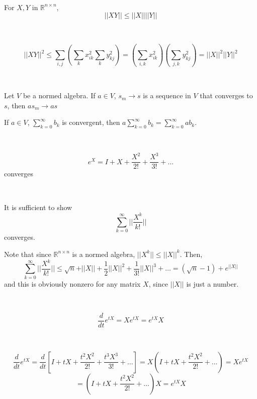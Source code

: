 \documentclass{article}
\begin{document}
\begin{proposition}
  \

  For $X,Y$ in $\mathbb{R}^{n \times n}$, $$\vert\vert XY\vert\vert\leq \vert\vert X\vert\vert \vert\vert Y\vert\vert$$
\end{proposition}

\begin{customproof}
  \

  $$\vert\vert XY\vert\vert ^2 \leq \sum_{i,j} (\sum_k x^2_{ik} \sum_{k} y^2_{kj}) = (\sum_{i,k} x^2_{ik})(\sum_{j,k} y^2_{kj}) = \vert\vert X\vert\vert^2 \vert\vert Y\vert\vert^2  $$
\end{customproof}

\begin{proposition}
  \

  Let $V$ be a normed algebra. If $a \in V$, $s_m \to s$ is a sequence in $V$ that converges to $s$, then $as_m \to as$

  If $a \in V$, $\sum_{k=0}^\infty b_k$ is convergent, then $a\sum_{k=0}^\infty b_k = \sum_{k=0}^\infty ab_k$.
\end{proposition}

\begin{proposition}
  \

  $$e^X = I + X + \frac{X^2}{2!} + \frac{X^3}{3!} + \dots$$converges
\end{proposition}

\begin{customproof}
  \

  It is sufficient to show $$\sum_{k=0}^\infty \vert\vert \frac{X^k}{k!}\vert\vert$$converges.

  Note that since $\mathbb{R}^{n \times n}$ is a normed algebra, $\vert\vert X^k\vert\vert \leq \vert\vert X\vert\vert^k$. Then,
  $$\sum_{k=0}^\infty \vert\vert \frac{X^k}{k!}\vert\vert \leq \sqrt{n} + \vert\vert X\vert\vert + \frac{1}{2} \vert\vert X\vert\vert^2 + \frac{1}{3!} \vert\vert X\vert\vert^3 + \dots = (\sqrt{n}-1)+e^{\vert\vert X\vert\vert }$$and this is obviously nonzero for any matrix $X$, since $\vert\vert X\vert\vert$ is just a number.
\end{customproof}

\begin{proposition}
  \

  $$\frac{d}{dt}e^{tX} = Xe^{tX} = e^{tX}X$$
\end{proposition}

\begin{customproof}
  \

  $$\frac{d}{dt}e^{tX} = \frac{d}{dt}[I + tX + \frac{t^2X^2}{2!} + \frac{t^3X^3}{3!} + \dots ] = X(I + tX + \frac{t^2X^2}{2!} + \dots) = Xe^{tX}$$$$ = (I + tX + \frac{t^2X^2}{2!} + \dots)X = e^{tX}X$$
\end{customproof}
\end{document}
